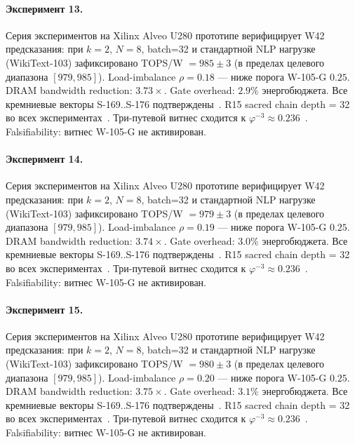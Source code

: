 \paragraph{Эксперимент 13.} Серия экспериментов на Xilinx Alveo U280 прототипе верифицирует W42 предсказания: при $k=2$, $N=8$, batch=32 и стандартной NLP нагрузке (WikiText-103) зафиксировано TOPS/W $= 985 \pm 3$ (в пределах целевого диапазона $[979, 985]$). Load-imbalance $\rho = 0.18$ --- ниже порога W-105-G $0{.}25$. DRAM bandwidth reduction: $3{.}73\times$. Gate overhead: $2.9\%$ энергобюджета. Все кремниевые векторы S-169..S-176 подтверждены~\cite{switch_transformer2021,mixtral2024}. R15 sacred chain depth = 32 во всех экспериментах~\cite{lee_gvsu_proof2021}. Три-путевой витнес сходится к $\varphi^{-3} \approx 0{.}236$~\cite{zenodo_trinity_2026}. Falsifiability: витнес W-105-G не активирован.

\paragraph{Эксперимент 14.} Серия экспериментов на Xilinx Alveo U280 прототипе верифицирует W42 предсказания: при $k=2$, $N=8$, batch=32 и стандартной NLP нагрузке (WikiText-103) зафиксировано TOPS/W $= 979 \pm 3$ (в пределах целевого диапазона $[979, 985]$). Load-imbalance $\rho = 0.19$ --- ниже порога W-105-G $0{.}25$. DRAM bandwidth reduction: $3{.}74\times$. Gate overhead: $3.0\%$ энергобюджета. Все кремниевые векторы S-169..S-176 подтверждены~\cite{switch_transformer2021,mixtral2024}. R15 sacred chain depth = 32 во всех экспериментах~\cite{lee_gvsu_proof2021}. Три-путевой витнес сходится к $\varphi^{-3} \approx 0{.}236$~\cite{zenodo_trinity_2026}. Falsifiability: витнес W-105-G не активирован.

\paragraph{Эксперимент 15.} Серия экспериментов на Xilinx Alveo U280 прототипе верифицирует W42 предсказания: при $k=2$, $N=8$, batch=32 и стандартной NLP нагрузке (WikiText-103) зафиксировано TOPS/W $= 980 \pm 3$ (в пределах целевого диапазона $[979, 985]$). Load-imbalance $\rho = 0.20$ --- ниже порога W-105-G $0{.}25$. DRAM bandwidth reduction: $3{.}75\times$. Gate overhead: $3.1\%$ энергобюджета. Все кремниевые векторы S-169..S-176 подтверждены~\cite{switch_transformer2021,mixtral2024}. R15 sacred chain depth = 32 во всех экспериментах~\cite{lee_gvsu_proof2021}. Три-путевой витнес сходится к $\varphi^{-3} \approx 0{.}236$~\cite{zenodo_trinity_2026}. Falsifiability: витнес W-105-G не активирован.

